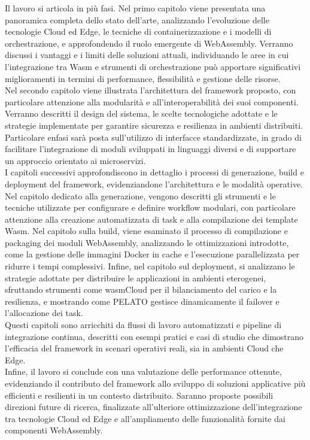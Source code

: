 Il lavoro si articola in più fasi. Nel primo capitolo viene presentata una panoramica completa dello stato dell’arte, analizzando l’evoluzione delle tecnologie Cloud ed Edge, le tecniche di containerizzazione e i modelli di orchestrazione, e approfondendo il ruolo emergente di WebAssembly. Verranno discussi i vantaggi e i limiti delle soluzioni attuali, individuando le aree in cui l’integrazione tra Wasm e strumenti di orchestrazione può apportare significativi miglioramenti in termini di performance, flessibilità e gestione delle risorse.\\
Nel secondo capitolo viene illustrata l’architettura del framework proposto, con particolare attenzione alla modularità e all’interoperabilità dei suoi componenti. Verranno descritti il design del sistema, le scelte tecnologiche adottate e le strategie implementate per garantire sicurezza e resilienza in ambienti distribuiti. Particolare enfasi sarà posta sull’utilizzo di interfacce standardizzate, in grado di facilitare l’integrazione di moduli sviluppati in linguaggi diversi e di supportare un approccio orientato ai microservizi.\\
I capitoli successivi approfondiscono in dettaglio i processi di generazione, build e deployment del framework, evidenziandone l’architettura e le modalità operative. Nel capitolo dedicato alla generazione, vengono descritti gli strumenti e le tecniche utilizzate per configurare e definire workflow modulari, con particolare attenzione alla creazione automatizzata di task e alla compilazione dei template Wasm. Nel capitolo sulla build, viene esaminato il processo di compilazione e packaging dei moduli WebAssembly, analizzando le ottimizzazioni introdotte, come la gestione delle immagini Docker\cite{Anderson2015Docker} in cache e l’esecuzione parallelizzata per ridurre i tempi complessivi. Infine, nel capitolo sul deployment, si analizzano le strategie adottate per distribuire le applicazioni in ambienti eterogenei, sfruttando strumenti come wasmCloud per il bilanciamento del carico e la resilienza, e mostrando come PELATO gestisce dinamicamente il failover e l’allocazione dei task.\\
Questi capitoli sono arricchiti da flussi di lavoro automatizzati e pipeline di integrazione continua, descritti con esempi pratici e casi di studio che dimostrano l’efficacia del framework in scenari operativi reali, sia in ambienti Cloud che Edge.\\
Infine, il lavoro si conclude con una valutazione delle performance ottenute, evidenziando il contributo del framework allo sviluppo di soluzioni applicative più efficienti e resilienti in un contesto distribuito. Saranno proposte possibili direzioni future di ricerca, finalizzate all’ulteriore ottimizzazione dell’integrazione tra tecnologie Cloud ed Edge e all’ampliamento delle funzionalità fornite dai componenti WebAssembly\cite{webassembly_component_model}.\\
